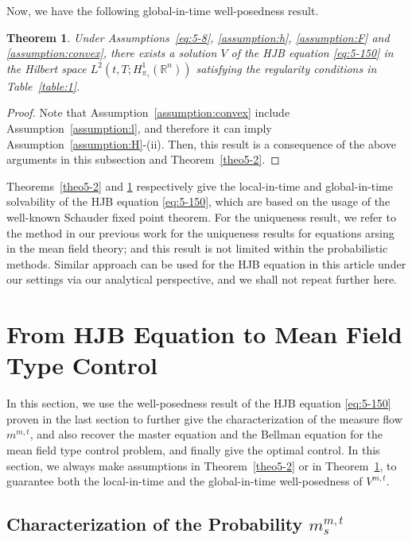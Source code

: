 \documentclass[11pt]{article}
\numberwithin{equation}{section}
\newtheorem{theorem}{Theorem}[section]
\newcommand{\brn}{{\mathbb{R}^n}}
\newcommand{\1}{\mbox{1\hspace{-1mm}I}}
\begin{document}
Now, we have the following global-in-time well-posedness result.

\begin{theorem}\label{theo5-3} 
Under Assumptions~\ref{eq:5-8}, \ref{assumption:h}, \ref{assumption:F} and \ref{assumption:convex}, there exists a solution $V$ of the HJB equation \eqref{eq:5-150} in the Hilbert space $L^{2}\left(t,T;H_{\pi_{\gamma}}^{1}(\brn)\right)$ satisfying the regularity conditions in Table~\ref{table:1}. 
\end{theorem}

\begin{proof}
Note that Assumption~\ref{assumption:convex} include Assumption~\ref{assumption:l}, and therefore it can imply Assumption~\ref{assumption:H}-(ii). Then, this result is a consequence of the above arguments in this subsection and Theorem~\ref{theo5-2}.
\end{proof}

Theorems~\ref{theo5-2} and \ref{theo5-3} respectively give the local-in-time and global-in-time solvability of the HJB equation \eqref{eq:5-150}, which are based on the usage of the well-known Schauder fixed point theorem. For the uniqueness result, we refer to the method in our previous work \cite{AB6,AB10,AB5} for the uniqueness results for equations arsing in the mean field theory; and this result is not limited within the probabilistic methods. Similar approach can be used for the HJB equation in this article under our settings via our analytical perspective, and we shall not repeat further here.

\section{From HJB Equation to Mean Field Type Control}\label{sec:m}

In this section, we use the well-posedness result of the HJB equation \eqref{eq:5-150} proven in the last section to further give the characterization of the measure flow $m^{m,t}$, and also recover the master equation and the Bellman equation for the  mean field type control problem, and finally give the optimal control. In this section, we always make assumptions in Theorem~\ref{theo5-2} or in Theorem~\ref{theo5-3}, to guarantee both the local-in-time and the global-in-time well-posedness of $V^{m,t}$.

\subsection{Characterization of the Probability $m^{m,t}_s$}\label{subsec:m}
\end{document}

